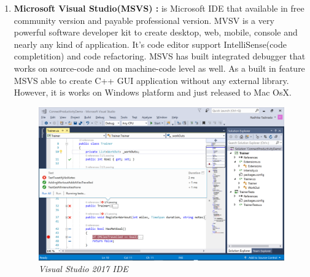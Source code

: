 \documentclass[12pt]{article}
\begin{document}
{{\begin{enumerate}
It does not include  a debugger for native code, but it provide debugger plug-in that acts interface between the IDE and the external debugger to debug C++ code. Supported debuggers are :
\begin{enumerate}
\item GNU debugger (GDB)
\item LLVM debugger (LLDB)
\item Microsoft Console Debugger (CDB)
\item Internal Javascript Debugger
\end{enumerate}

Supported platforms : 
\begin{enumerate}
\item Linux
\item Windows
\item MacOS
\end{enumerate}

\item \textbf{Microsoft Visual Studio(MSVS) : } is Microsoft IDE that available in free community version and payable professional version. MVSV is a very powerful software developer kit to create desktop, web, mobile, console and nearly any kind of application. It's code editor support IntelliSense(code completition) and code refactoring. MSVS has built integrated debugger that works on source-code and on machine-code level as well. As a built in feature MSVS able to create C++ GUI application without any external library. However, it is works on Windows platform and just released to Mac OsX.\cite{VS}\\

\begin{figure}[h!]
\centering
\includegraphics[scale=0.5]{Pictures/visualStudio.png}
\caption{\textit{\color{gray}Visual Studio 2017 IDE \cite{visualstudio}}}
\end{figure}




\end{enumerate}}}
\end{document}
